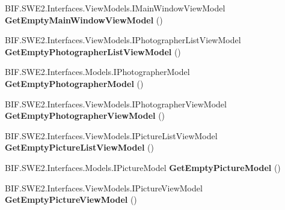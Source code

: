 \begin{DoxyCompactItemize}
\item 
\mbox{\label{class_pic_d_b_1_1_uebungen_1_1_u_e_b1_aab0e273a2d0c7692467ecdc365541e9c}} 
B\+I\+F.\+S\+W\+E2.\+Interfaces.\+View\+Models.\+I\+Main\+Window\+View\+Model {\bfseries Get\+Empty\+Main\+Window\+View\+Model} ()
\item 
\mbox{\label{class_pic_d_b_1_1_uebungen_1_1_u_e_b1_ac47dbc876c9d4b6b4a73cc8970adc4e3}} 
B\+I\+F.\+S\+W\+E2.\+Interfaces.\+View\+Models.\+I\+Photographer\+List\+View\+Model {\bfseries Get\+Empty\+Photographer\+List\+View\+Model} ()
\item 
\mbox{\label{class_pic_d_b_1_1_uebungen_1_1_u_e_b1_ad20e9e764e42c478517d0770198fe705}} 
B\+I\+F.\+S\+W\+E2.\+Interfaces.\+Models.\+I\+Photographer\+Model {\bfseries Get\+Empty\+Photographer\+Model} ()
\item 
\mbox{\label{class_pic_d_b_1_1_uebungen_1_1_u_e_b1_ac3ae5196472bee80f52a2fd25a36709d}} 
B\+I\+F.\+S\+W\+E2.\+Interfaces.\+View\+Models.\+I\+Photographer\+View\+Model {\bfseries Get\+Empty\+Photographer\+View\+Model} ()
\item 
\mbox{\label{class_pic_d_b_1_1_uebungen_1_1_u_e_b1_a00f53ea2e7a2d1d3625d5a176c757174}} 
B\+I\+F.\+S\+W\+E2.\+Interfaces.\+View\+Models.\+I\+Picture\+List\+View\+Model {\bfseries Get\+Empty\+Picture\+List\+View\+Model} ()
\item 
\mbox{\label{class_pic_d_b_1_1_uebungen_1_1_u_e_b1_af02fdb670055bfe8377f5d9fef7d2b72}} 
B\+I\+F.\+S\+W\+E2.\+Interfaces.\+Models.\+I\+Picture\+Model {\bfseries Get\+Empty\+Picture\+Model} ()
\item 
\mbox{\label{class_pic_d_b_1_1_uebungen_1_1_u_e_b1_a73bc371fefee7094c408c2c8b8ba9e01}} 
B\+I\+F.\+S\+W\+E2.\+Interfaces.\+View\+Models.\+I\+Picture\+View\+Model {\bfseries Get\+Empty\+Picture\+View\+Model} ()
\item 
\mbox{\label{class_pic_d_b_1_1_uebungen_1_1_u_e_b1_a78830b2ea7ec7cf5be9b2f8bb75cefee}} 

\end{DoxyCompactItemize}
